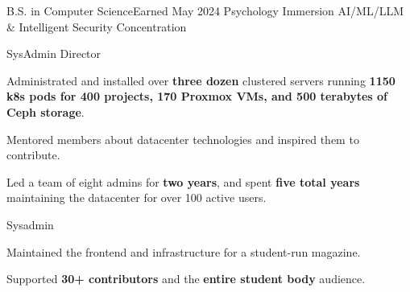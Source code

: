 \vspace{1.5pt} %

{B.S. in Computer Science}{Earned May 2024}
{Psychology Immersion}
{AI/ML/LLM \& Intelligent Security Concentration}

\cvtag{\LaTeX}

\smallskip


{
	{SysAdmin Director}    \hfill{}\newline
}
{
	\item{Administrated and installed over \textbf{three dozen} clustered servers running \textbf{1150 k8s pods for 400 projects, 170 Proxmox VMs, and 500 terabytes of Ceph storage}.}
	\item{Mentored members about datacenter technologies and inspired them to contribute.}
	\item{Led a team of eight admins for \textbf{two years}, and spent \textbf{five total years} maintaining the datacenter for over 100 active users.}
}

{
	{Sysadmin} \hfill{}\newline
}
{
	\item{Maintained the frontend and infrastructure for a student-run magazine.}
	\item{Supported \textbf{30+ contributors} and the \textbf{entire student body} audience.}
}

